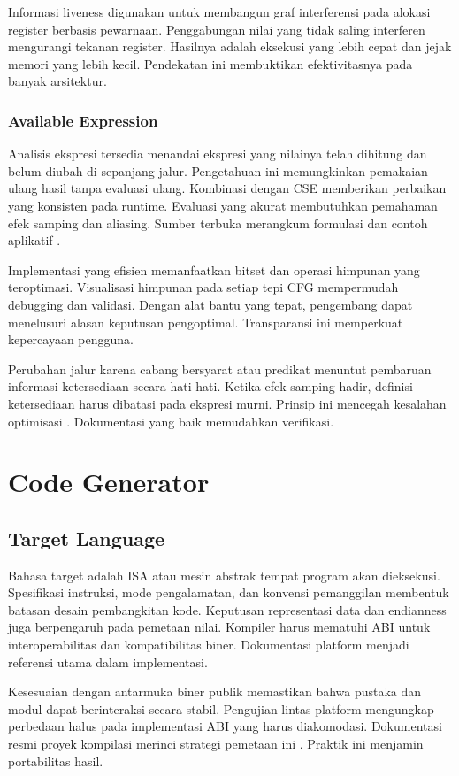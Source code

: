 \documentclass[../main.tex]{subfiles}
\begin{document}
Informasi liveness digunakan untuk membangun graf interferensi pada alokasi register berbasis pewarnaan. Penggabungan nilai yang tidak saling interferen mengurangi tekanan register. Hasilnya adalah eksekusi yang lebih cepat dan jejak memori yang lebih kecil. Pendekatan ini membuktikan efektivitasnya pada banyak arsitektur.

\subsubsection{Available Expression}
Analisis ekspresi tersedia menandai ekspresi yang nilainya telah dihitung dan belum diubah di sepanjang jalur. Pengetahuan ini memungkinkan pemakaian ulang hasil tanpa evaluasi ulang. Kombinasi dengan CSE memberikan perbaikan yang konsisten pada runtime. Evaluasi yang akurat membutuhkan pemahaman efek samping dan aliasing. Sumber terbuka merangkum formulasi dan contoh aplikatif \citep{WikiAvailableExpr}.

Implementasi yang efisien memanfaatkan bitset dan operasi himpunan yang teroptimasi. Visualisasi himpunan pada setiap tepi CFG mempermudah debugging dan validasi. Dengan alat bantu yang tepat, pengembang dapat menelusuri alasan keputusan pengoptimal. Transparansi ini memperkuat kepercayaan pengguna.

Perubahan jalur karena cabang bersyarat atau predikat menuntut pembaruan informasi ketersediaan secara hati-hati. Ketika efek samping hadir, definisi ketersediaan harus dibatasi pada ekspresi murni. Prinsip ini mencegah kesalahan optimisasi \citep{WikiAvailableExpr}. Dokumentasi yang baik memudahkan verifikasi.

\section{Code Generator}
\subsection{Target Language}
Bahasa target adalah ISA atau mesin abstrak tempat program akan dieksekusi. Spesifikasi instruksi, mode pengalamatan, dan konvensi pemanggilan membentuk batasan desain pembangkitan kode. Keputusan representasi data dan endianness juga berpengaruh pada pemetaan nilai. Kompiler harus mematuhi ABI untuk interoperabilitas dan kompatibilitas biner. Dokumentasi platform menjadi referensi utama dalam implementasi.

Kesesuaian dengan antarmuka biner publik memastikan bahwa pustaka dan modul dapat berinteraksi secara stabil. Pengujian lintas platform mengungkap perbedaan halus pada implementasi ABI yang harus diakomodasi. Dokumentasi resmi proyek kompilasi merinci strategi pemetaan ini \citep{GCCInternals}. Praktik ini menjamin portabilitas hasil.
\end{document}
